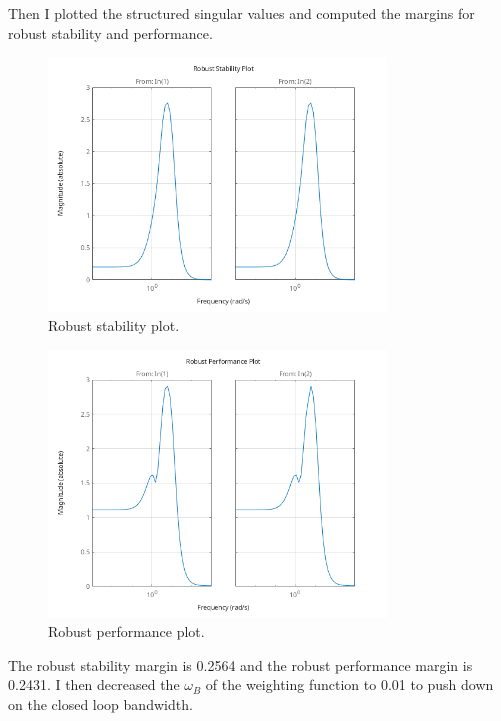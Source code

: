 \documentclass{article}
\begin{document}
Then I plotted the structured singular values and computed the margins for robust stability and performance.

\begin{figure}[H]
    \centering
    \includegraphics[width=0.8\textwidth]{robustStabilityPlot.png}
    \caption{Robust stability plot.}
    \label{fig:robustStabilityPlot}
\end{figure}

\begin{figure}[H]
    \centering
    \includegraphics[width=0.8\textwidth]{robustPerformancePlot.png}
    \caption{Robust performance plot.}
    \label{fig:robustPerformancePlot}
\end{figure}

The robust stability margin is 0.2564 and the robust performance margin is 0.2431.
I then decreased the $\omega_B$ of the weighting function to 0.01 to push down on the closed loop bandwidth.
\end{document}
